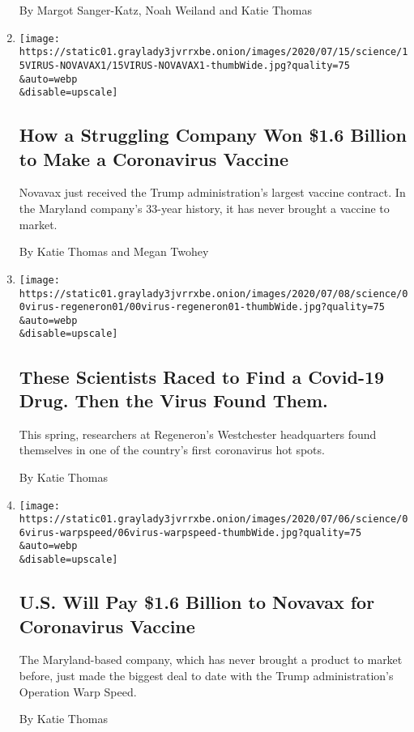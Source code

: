 \begin{enumerate}
  By Margot Sanger-Katz, Noah Weiland and Katie Thomas
\item
  \href{/2020/07/16/health/coronavirus-vaccine-novavax.html}{}

  \texttt{[image: https://static01.graylady3jvrrxbe.onion/images/2020/07/15/science/15VIRUS-NOVAVAX1/15VIRUS-NOVAVAX1-thumbWide.jpg?quality=75\\\&auto=webp\\\&disable=upscale]}

  \hypertarget{how-a-struggling-company-won-16-billion-to-make-a-coronavirus-vaccine}{%
  \subsection{How a Struggling Company Won \$1.6 Billion to Make a
  Coronavirus
  Vaccine}\label{how-a-struggling-company-won-16-billion-to-make-a-coronavirus-vaccine}}

  Novavax just received the Trump administration's largest vaccine
  contract. In the Maryland company's 33-year history, it has never
  brought a vaccine to market.

  By Katie Thomas and Megan Twohey
\item
  \href{/2020/07/09/health/regeneron-monoclonal-antibodies.html}{}

  \texttt{[image: https://static01.graylady3jvrrxbe.onion/images/2020/07/08/science/00virus-regeneron01/00virus-regeneron01-thumbWide.jpg?quality=75\\\&auto=webp\\\&disable=upscale]}

  \hypertarget{these-scientists-raced-to-find-a-covid-19-drug-then-the-virus-found-them}{%
  \subsection{These Scientists Raced to Find a Covid-19 Drug. Then the
  Virus Found
  Them.}\label{these-scientists-raced-to-find-a-covid-19-drug-then-the-virus-found-them}}

  This spring, researchers at Regeneron's Westchester headquarters found
  themselves in one of the country's first coronavirus hot spots.

  By Katie Thomas
\item
  \href{/2020/07/07/health/novavax-coronavirus-vaccine-warp-speed.html}{}

  \texttt{[image: https://static01.graylady3jvrrxbe.onion/images/2020/07/06/science/06virus-warpspeed/06virus-warpspeed-thumbWide.jpg?quality=75\\\&auto=webp\\\&disable=upscale]}

  \hypertarget{us-will-pay-16-billion-to-novavax-for-coronavirus-vaccine}{%
  \subsection{U.S. Will Pay \$1.6 Billion to Novavax for Coronavirus
  Vaccine}\label{us-will-pay-16-billion-to-novavax-for-coronavirus-vaccine}}

  The Maryland-based company, which has never brought a product to
  market before, just made the biggest deal to date with the Trump
  administration's Operation Warp Speed.

  By Katie Thomas
\end{enumerate}

